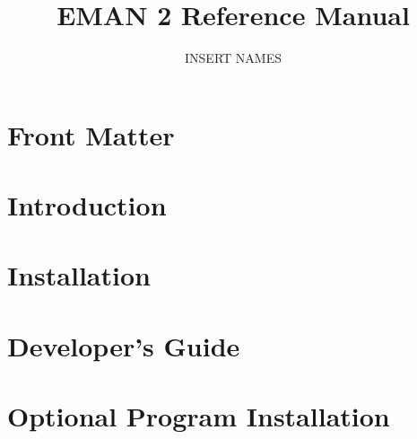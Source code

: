 \documentclass{manual}
\title{EMAN 2 Reference Manual}
\author{INSERT NAMES}
\date{}
\begin{document}
\maketitle

\ifhtml
\chapter*{Front Matter\label{front}}
\fi

%
\setcounter{tocdepth}{2}
\tableofcontents

\chapter{Introduction} 




\chapter{Installation} \label{INSTALL} 


%

\chapter{Developer's Guide} 
  \label{DEVELOPERS-GUIDE} 

 
 
 




 \label{MISC-DEVELOPERS-GUIDE}

%


\appendix

\chapter{Optional Program Installation} 


%


\printindex
\end{document}
